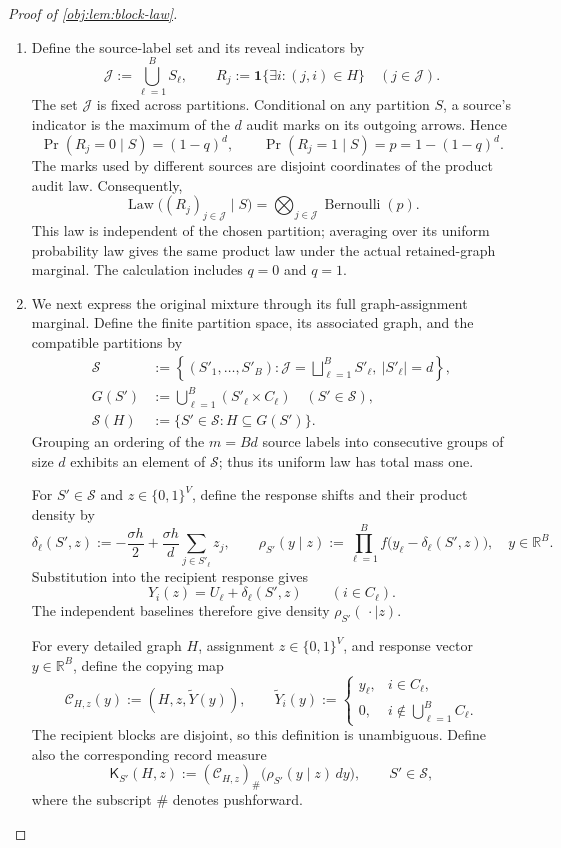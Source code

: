 \documentclass[11pt]{article}
\begin{document}
\begin{proof}[Proof of \cref{obj:lem:block-law}]
\begin{enumerate}
\item Define the source-label set and its reveal indicators by
\[
\mathcal J:=\bigcup_{\ell=1}^{B}S_\ell,
\qquad
R_j:=\mathbf1\{\exists i:(j,i)\in H\}
\quad(j\in\mathcal J).
\]
The set \(\mathcal J\) is fixed across partitions. Conditional on any partition \(S\), a source's indicator is the maximum of the \(d\) audit marks on its outgoing arrows. Hence
\[
\Pr(R_j=0\mid S)=(1-q)^d,
\qquad
\Pr(R_j=1\mid S)=p=1-(1-q)^d.
\]
The marks used by different sources are disjoint coordinates of the product audit law. Consequently,
\[
\operatorname{Law}\bigl((R_j)_{j\in\mathcal J}\mid S\bigr)
=
\bigotimes_{j\in\mathcal J}\operatorname{Bernoulli}(p).
\]
This law is independent of the chosen partition; averaging over its uniform probability law gives the same product law under the actual retained-graph marginal. The calculation includes \(q=0\) and \(q=1\). %

\item We next express the original mixture through its full graph-assignment marginal. Define the finite partition space, its associated graph, and the compatible partitions by
\[
\begin{aligned}
\mathcal S
&:=\left\{(S'_1,\ldots,S'_B):
\mathcal J=\bigsqcup_{\ell=1}^{B}S'_\ell,\ 
|S'_\ell|=d\right\},\\
G(S')&:=\bigcup_{\ell=1}^{B}(S'_\ell\times C_\ell)
\quad(S'\in\mathcal S),\\
\mathcal S(H)&:=\{S'\in\mathcal S:H\subseteq G(S')\}.
\end{aligned}
\]
Grouping an ordering of the \(m=Bd\) source labels into consecutive groups of size \(d\) exhibits an element of \(\mathcal S\); thus its uniform law has total mass one.

For \(S'\in\mathcal S\) and \(z\in\{0,1\}^{V}\), define the response shifts and their product density by
\[
\delta_\ell(S',z)
:=-\frac{\sigma h}{2}
+\frac{\sigma h}{d}\sum_{j\in S'_\ell}z_j,
\qquad
\rho_{S'}(y\mid z)
:=\prod_{\ell=1}^{B}f\bigl(y_\ell-\delta_\ell(S',z)\bigr),
\quad y\in\mathbb R^B.
\]
Substitution into the recipient response gives
\[
Y_i(z)=U_\ell+\delta_\ell(S',z)
\qquad(i\in C_\ell).
\]
The independent baselines therefore give density \(\rho_{S'}(\,\cdot\mid z)\).

For every detailed graph \(H\), assignment \(z\in\{0,1\}^{V}\), and response vector \(y\in\mathbb R^B\), define the copying map
\[
\mathcal C_{H,z}(y):=(H,z,\widetilde Y(y)),
\qquad
\widetilde Y_i(y):=
\begin{cases}
y_\ell,&i\in C_\ell,\\
0,&i\notin\bigcup_{\ell=1}^{B}C_\ell.
\end{cases}
\]
The recipient blocks are disjoint, so this definition is unambiguous. Define also the corresponding record measure
\[
\mathsf K_{S'}(H,z)
:=
(\mathcal C_{H,z})_{\#}
\bigl(\rho_{S'}(y\mid z)\,dy\bigr),
\qquad
S'\in\mathcal S,
\]
where the subscript \(\#\) denotes pushforward.


\end{enumerate}
\end{proof}
\end{document}
